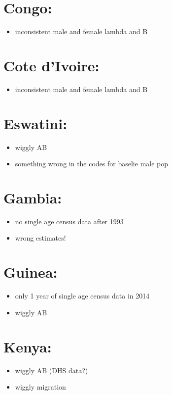 \documentclass[12pt,a4paper]{article}
\begin{document}
\section*{Congo:}
\begin{itemize}
\item inconsistent male and female lambda and B 
\end{itemize}

\section*{Cote d'Ivoire:}
\begin{itemize}
\item inconsistent male and female lambda and B
\end{itemize}

\section*{Eswatini:}
\begin{itemize}
\item wiggly AB
\item something wrong in the codes for baselie male pop
\end{itemize}

\section*{Gambia:}
\begin{itemize}
\item no single age census data after 1993
\item wrong estimates!
\end{itemize}

\section*{Guinea:}
\begin{itemize}
\item only 1 year of single age census data in 2014
\item wiggly AB	
\end{itemize}

\section*{Kenya:}
\begin{itemize}
\item wiggly AB (DHS data?)
\item wiggly migration
\end{itemize}
\end{document}
